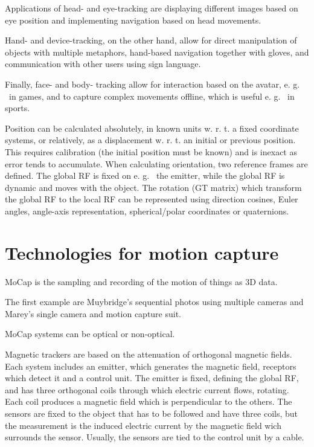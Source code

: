 \documentclass[a4paper]{article}
\begin{document}
Applications of head- and eye-tracking are displaying different images
based on eye position and implementing navigation based on head
movements.

Hand- and device-tracking, on the other hand, allow for direct
manipulation of objects with multiple metaphors, hand-based navigation
together with gloves, and communication with other users using sign
language.

Finally, face- and body- tracking allow for interaction based on the
avatar, e.
g.
~in games, and to capture complex movements offline, which
is useful e.
g.
~in sports.

Position can be calculated absolutely, in known units w.
r.
t.
a fixed
coordinate systems, or relatively, as a displacement w.
r.
t.
an initial
or previous position.
This requires calibration (the initial position
must be known) and is inexact as error tends to accumulate.
When
calculating orientation, two reference frames are defined.
The global RF
is fixed on e.
g.
~the emitter, while the global RF is dynamic and moves
with the object.
The rotation (GT matrix) which transform the global RF
to the local RF can be represented using direction cosines, Euler
angles, angle-axis representation, spherical/polar coordinates or
quaternions.

\section{Technologies for motion capture}

MoCap is the sampling and recording of the motion of things as 3D data.

The first example are Muybridge's sequential photos using multiple
cameras and Marey's single camera and motion capture suit.

MoCap systems can be optical or non-optical.

Magnetic trackers are based on the attenuation of orthogonal magnetic
fields.
Each system includes an emitter, which generates the magnetic
field, receptors which detect it and a control unit.
The emitter is
fixed, defining the global RF, and has three orthogonal coils through
which electric current flows, rotating.
Each coil produces a magnetic
field which is perpendicular to the others.
The sensors are fixed to the
object that has to be followed and have three coils, but the measurement
is the induced electric current by the magnetic field wich surrounds the
sensor.
Usually, the sensors are tied to the control unit by a cable.
\end{document}
